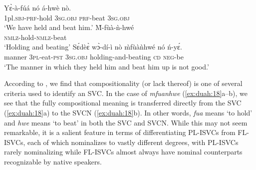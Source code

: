 \documentclass[output=paper,modfonts,nonflat,colorlinks, citecolor=brown, hidelinks]{langsci/langscibook}
\begin{document}
\ea\label{ex:duah:18}
\ea\label{ex:duah:18a}
\gll Yɛ̀-à-fúá nó á-hwè nò.\\
1pl.\textsc{sbj}-\textsc{prf}-hold 3\textsc{sg}.\textsc{obj} \textsc{prf}-beat 3\textsc{sg}.\textsc{obj}\\
\glt `We have held and beat him.'
\ex\label{ex:duah:18b}
\gll M̀-fùà-ǹ-hwé\\
\textsc{nmlz}-hold-\textsc{nmlz}-beat\\
\glt `Holding and beating'
\ex\label{ex:duah:18c}
\gll Sɛ́dèɛ̀ wɔ̀-dí-ì nò m̀fùàǹhwé nó ń-yɛ́.\\
manner 3\textsc{pl}-eat-\textsc{pst}	3\textsc{sg}.\textsc{obj}	holding-and-beating	\textsc{cd} \textsc{neg}-be\\
\glt `The manner in which they held him and beat him up is not good.'
\z
\z

According to \citet{barkema1996}, we find that compositionality (or lack thereof) is one of several criteria used to identify an SVC. In the case of \textit{mfuanhwe} (\ref{ex:duah:18}a--b), we see that the fully compositional meaning is transferred directly from the SVC (\ref{ex:duah:18}a) to the SVCN (\ref{ex:duah:18}b). In other words, \textit{fua} means ‘to hold’ and \textit{hwe} means ‘to beat’ in both the SVC and SVCN. While this may not seem remarkable, it is a salient feature in terms of differentiating PL-ISVCs from FL-ISVCs, each of which nominalizes to vastly different degrees, with PL-ISVCs rarely nominalizing while FL-ISVCs almost always have nominal counterparts recognizable by native speakers.
\end{document}
